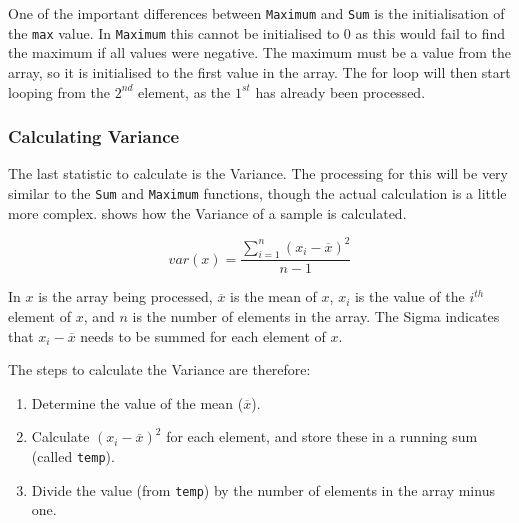 One of the important differences between \texttt{Maximum} and \texttt{Sum} is the initialisation of the \texttt{max} value. In \texttt{Maximum} this cannot be initialised to 0 as this would fail to find the maximum if all values were negative. The maximum must be a value from the array, so it is initialised to the first value in the array. The for loop will then start looping from the $2^{nd}$ element, as the $1^{st}$ has already been processed.


% 


\subsubsection{Calculating Variance} %
\label{ssub:calculating_variance}

The last statistic to calculate is the Variance. The processing for this will be very similar to the \texttt{Sum} and \texttt{Maximum} functions, though the actual calculation is a little more complex.  shows how the Variance of a sample is calculated.

\begin{equation}
  \label{eq:var}
  var(x) = \frac{\displaystyle \sum_{i=1}^{n}(x_{i} - \overline{x})^2}{n - 1}
\end{equation}

In  $x$ is the array being processed, $\overline{x}$ is the mean of $x$, $x_i$ is the value of the $i^{th}$ element of $x$, and $n$ is the number of elements in the array. The Sigma indicates that $x_{i} - \overline{x}$ needs to be summed for each element of $x$.

The steps to calculate the Variance are therefore:
\begin{enumerate}
  \item Determine the value of the mean ($\overline{x}$).
  \item Calculate $(x_{i} - \overline{x})^2$ for each element, and store these in a running sum (called \texttt{temp}).
  \item Divide the value (from \texttt{temp}) by the number of elements in the array minus one.
\end{enumerate}

